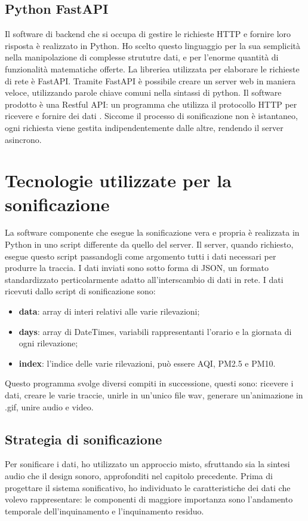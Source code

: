 \subsection{Python FastAPI}
Il software di backend che si occupa di gestire le richieste HTTP e fornire loro risposta è realizzato in Python.
Ho scelto questo linguaggio per la sua semplicità nella manipolazione di complesse strututre dati, e per l'enorme quantità di funzionalità matematiche offerte.
La libreriea utilizzata per elaborare le richieste di rete è FastAPI.
Tramite FastAPI è possibile creare un server web in maniera veloce, utilizzando parole chiave comuni nella sintassi di python.
Il software prodotto è una Restful API: un programma che utilizza il protocollo HTTP per ricevere e fornire dei dati \cite{api}.
Siccome il processo di sonificazione non è istantaneo, ogni richiesta viene gestita indipendentemente dalle altre, rendendo il server asincrono.




\section{Tecnologie utilizzate per la sonificazione}

La software componente che esegue la sonificazione vera e propria è realizzata in Python in uno script differente da quello del server.
Il server, quando richiesto, esegue questo script passandogli come argomento tutti i dati necessari per produrre la traccia.
I dati inviati sono sotto forma di JSON, un formato standardizzato perticolarmente adatto all'interscambio di dati in rete.
I dati ricevuti dallo script di sonificazione sono: 
\begin{itemize}
    \item \textbf{data}: array di interi relativi alle varie rilevazioni;
    \item \textbf{days}: array di DateTimes, variabili rappresentanti l'orario e la giornata di ogni rilevazione;
    \item \textbf{index}: l'indice delle varie rilevazioni, può essere AQI, PM2.5 e PM10.
\end{itemize}
Questo programma svolge diversi compiti in successione, questi sono: ricevere i dati, creare le varie traccie, unirle in un'unico file wav, generare un'animazione in .gif, unire audio e video.

\subsection{Strategia di sonificazione}
Per sonificare i dati, ho utilizzato un approccio misto, sfruttando sia la sintesi audio che il design sonoro, approfonditi nel capitolo precedente.
Prima di progettare il sistema sonificativo, ho individuato le caratteristiche dei dati che volevo rappresentare:
le componenti di maggiore importanza sono l’andamento temporale dell'inquinamento e l'inquinamento residuo.

